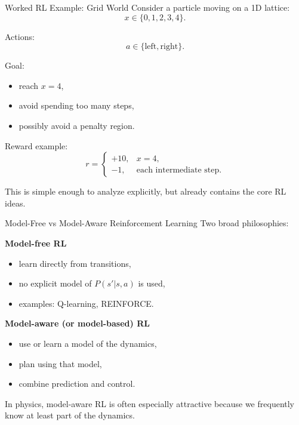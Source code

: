 \documentclass[aspectratio=169]{beamer}
\begin{document}
\begin{frame}{Worked RL Example: Grid World}
  Consider a particle moving on a 1D lattice:
  \[
  x \in \{0,1,2,3,4\}.
  \]

  Actions:
  \[
  a \in \{\text{left},\text{right}\}.
  \]

  Goal:
  \begin{itemize}
  \item reach $x=4$,
  \item avoid spending too many steps,
  \item possibly avoid a penalty region.
  \end{itemize}

  Reward example:
  \[
  r=
  \begin{cases}
    +10, & x=4,\\
    -1, & \text{each intermediate step}.
  \end{cases}
  \]

  This is simple enough to analyze explicitly, but already contains the core RL ideas.
\end{frame}


\begin{frame}{Model-Free vs Model-Aware Reinforcement Learning}
  Two broad philosophies:

  \textbf{Model-free RL}
  \begin{itemize}
  \item learn directly from transitions,
  \item no explicit model of $P(s'|s,a)$ is used,
  \item examples: Q-learning, REINFORCE.
  \end{itemize}

  \textbf{Model-aware (or model-based) RL}
  \begin{itemize}
  \item use or learn a model of the dynamics,
  \item plan using that model,
  \item combine prediction and control.
  \end{itemize}

  In physics, model-aware RL is often especially attractive because we frequently know at least part of the dynamics.
\end{frame}
\end{document}
